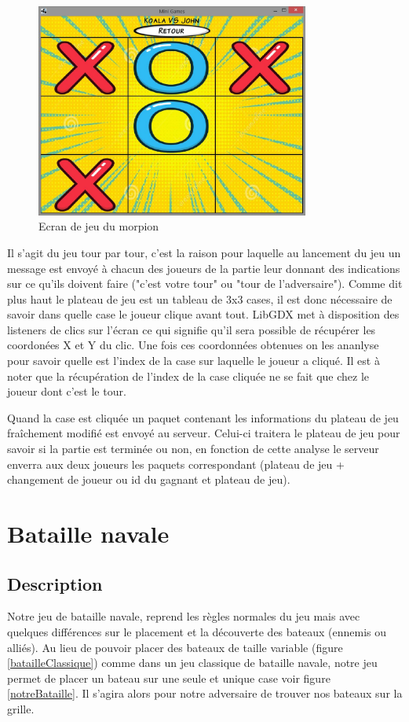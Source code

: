 \documentclass{report}
\begin{document}
\begin{figure}[H]
	\centering\includegraphics[width=9cm]{morpioningame}
	\caption{Ecran de jeu du morpion}
  \label{morpion_en_jeu}
\end{figure}

Il s'agit du jeu tour par tour, c'est la raison pour laquelle au lancement du jeu un message est envoyé à chacun des joueurs de la partie
leur donnant des indications sur ce qu'ils doivent faire ("c'est votre tour" ou "tour de l'adversaire").
Comme dit plus haut le plateau de jeu est un tableau de 3x3 cases, il est donc nécessaire
de savoir dans quelle case le joueur clique avant tout. LibGDX met à disposition des listeners de clics sur l'écran ce qui signifie qu'il sera possible
de récupérer les coordonées X et Y du clic. Une fois ces coordonnées obtenues on les ananlyse pour savoir quelle est l'index de la case sur laquelle
le joueur a cliqué. Il est à noter que la récupération de l'index de la case cliquée ne se fait que chez le joueur dont c'est le tour.

Quand la case est cliquée un paquet contenant les informations du plateau de jeu fraîchement modifié est envoyé au serveur. Celui-ci traitera le plateau de jeu
pour savoir si la partie est terminée ou non, en fonction de cette analyse le serveur enverra aux deux joueurs les paquets correspondant (plateau de jeu +
 changement de joueur ou id du gagnant et plateau de jeu).

\section{Bataille navale}
\label{Bataille navale}

\subsection{Description}
Notre jeu de bataille navale, reprend les règles normales du jeu mais avec quelques différences sur le placement et la découverte des bateaux (ennemis ou alliés). Au lieu de pouvoir placer
des bateaux de taille variable (figure \ref{batailleClassique}) comme dans un jeu classique de bataille navale, notre jeu permet de placer un bateau sur une seule et unique case
voir figure \ref{notreBataille}. Il s'agira alors pour notre adversaire de trouver nos bateaux sur la grille.
\end{document}
